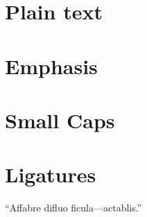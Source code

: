 \documentclass{article}
\begin{document}
\section{Plain text}

\frenchspacing
\lipsum[1]

\section{Emphasis}

\emph{\lipsum[2]}

\section{Small Caps}

\textsc{\lipsum[3]}

\section{Ligatures}

``Affabre difluo ficula---actablis.''
\end{document}
